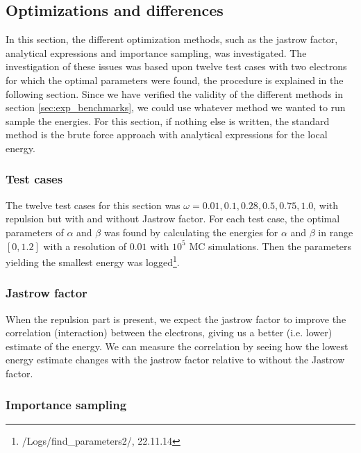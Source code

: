 \subsection{Optimizations and differences} \label{sec:exp_opt_and_diff}

In this section, the different optimization methods, such as the jastrow factor, analytical expressions and importance sampling, was investigated. 
The investigation of these issues was based upon twelve test cases with two electrons for which the optimal parameters were found, the procedure is explained in the following section.
Since we have verified the validity of the different methods in section \ref{sec:exp_benchmarks}, we could use whatever method we wanted to run sample the energies. 
For this section, if nothing else is written, the standard method is the brute force approach with analytical expressions for the local energy. 

\subsubsection{Test cases}

The twelve test cases for this section was $\omega = 0.01, 0.1, 0.28, 0.5, 0.75, 1.0$, with repulsion but with and without Jastrow factor.
For each test case, the optimal parameters of $\alpha$ and $\beta$ was found by calculating the energies for $\alpha$ and $\beta$ in range $[0,1.2]$ with a resolution of $0.01$ with $10^5$ MC simulations.
Then the parameters yielding the smallest energy was logged\footnote{/Logs/find\_parameters2/, 22.11.14}. 

\subsubsection{Jastrow factor}

When the repulsion part is present, we expect the jastrow factor to improve the correlation (interaction) between the electrons, giving us a better (i.e. lower) estimate of the energy. 
We can measure the correlation by seeing how the lowest energy estimate changes with the jastrow factor relative to without the Jastrow factor. 

\subsubsection{Importance sampling}

